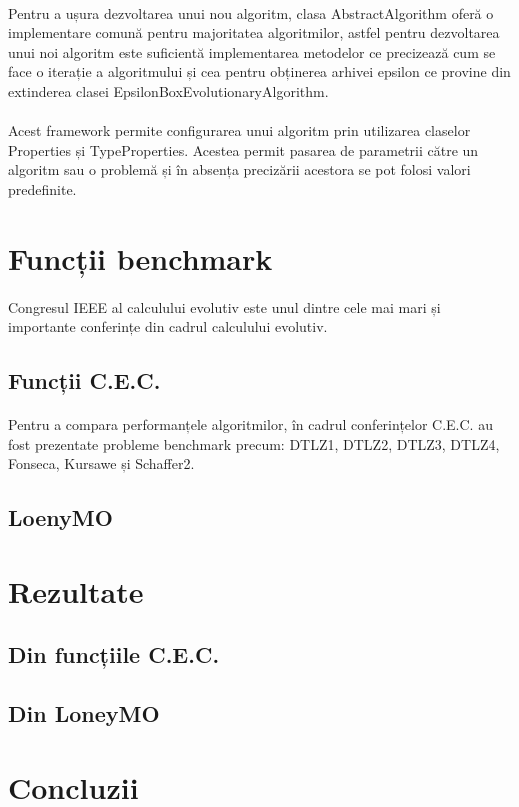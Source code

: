 \documentclass[12pt]{article}
\begin{document}
\paragraph{}
Pentru a ușura dezvoltarea unui nou algoritm, clasa AbstractAlgorithm oferă o implementare comună pentru majoritatea algoritmilor, astfel pentru dezvoltarea unui noi algoritm este suficientă  implementarea metodelor ce precizează cum se face o iterație a algoritmului și cea pentru obținerea arhivei epsilon ce provine din extinderea clasei EpsilonBoxEvolutionaryAlgorithm.
\paragraph{}
Acest framework permite configurarea unui algoritm prin utilizarea claselor Properties și TypeProperties. Acestea permit pasarea de parametrii către un algoritm sau o problemă și în absența precizării acestora se pot folosi valori predefinite.


\section{Funcții benchmark}
\paragraph{}
Congresul IEEE al calculului evolutiv este unul dintre cele mai mari și importante conferințe din cadrul calculului evolutiv.
\subsection{Funcții C.E.C.}
\paragraph{}
Pentru a compara performanțele algoritmilor, în cadrul conferințelor C.E.C. au fost prezentate probleme benchmark precum: DTLZ1, DTLZ2, DTLZ3, DTLZ4, Fonseca, Kursawe și Schaffer2.
\subsection{LoenyMO}
\section{Rezultate}
\subsection{Din funcțiile C.E.C.}
\subsection{Din LoneyMO}
\section{Concluzii}
\newpage
\printbibliography
\end{document}

